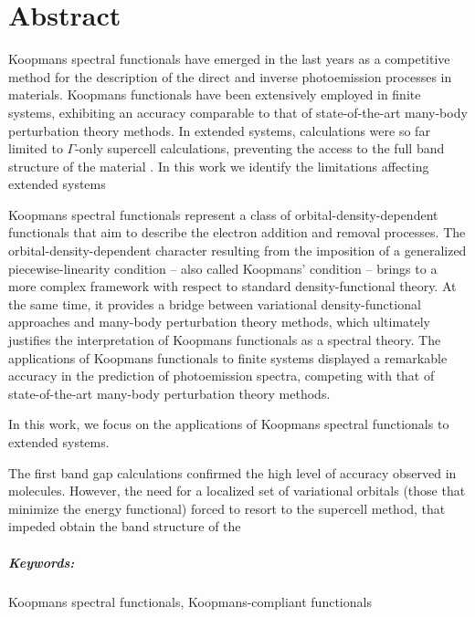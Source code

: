 \begingroup
\let\cleardoublepage\clearpage

\cleardoublepage
\chapter*{Abstract}
\vspace{2cm}
%

Koopmans spectral functionals have emerged in the last years as a competitive method for the description of the direct and inverse photoemission processes in materials. Koopmans functionals have been extensively employed in finite systems, exhibiting an accuracy comparable to that of state-of-the-art many-body perturbation theory methods. In extended systems, calculations were so far limited to $\Gamma$-only supercell calculations, preventing the access to the full band structure of the material . In this work we identify the limitations affecting extended systems 

Koopmans spectral functionals represent a class of orbital-density-dependent functionals that aim to describe the electron addition and removal processes. The orbital-density-dependent character resulting from the imposition of a generalized piecewise-linearity condition -- also called Koopmans' condition -- brings to a more complex framework with respect to standard density-functional theory. At the same time, it provides a bridge between variational density-functional approaches and many-body perturbation theory methods, which ultimately justifies the interpretation of Koopmans functionals as a spectral theory. The applications of Koopmans functionals to finite systems displayed a remarkable accuracy in the prediction of photoemission spectra, competing with that of state-of-the-art many-body perturbation theory methods.

In this work, we focus on the applications of Koopmans spectral functionals to extended systems. 

The first band gap calculations confirmed the high level of accuracy observed in molecules. However, the need for a localized set of variational orbitals (those that minimize the energy functional) forced to resort to the supercell method, that impeded obtain the band structure of the 


%
\paragraph{Keywords:}
Koopmans spectral functionals,
Koopmans-compliant functionals
%

